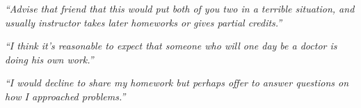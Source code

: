 \documentclass[12pt]{beamer}
\newcommand\ans[1]{{\it ``#1''}}
\newcommand\gap{\vspace{5mm}}
\begin{document}
\begin{frame}

\ans{Advise  that  friend  that  this  would  put  both  of  you  two  in  a  terrible  situation,  and usually instructor takes later homeworks or gives partial credits.}

\gap

\ans{I think it's reasonable to expect that someone who will one day be a doctor is doing his own work.}

\gap

\ans{I would decline to share my homework but perhaps offer to answer questions on how I approached problems.}


  











\end{frame}
\end{document}
